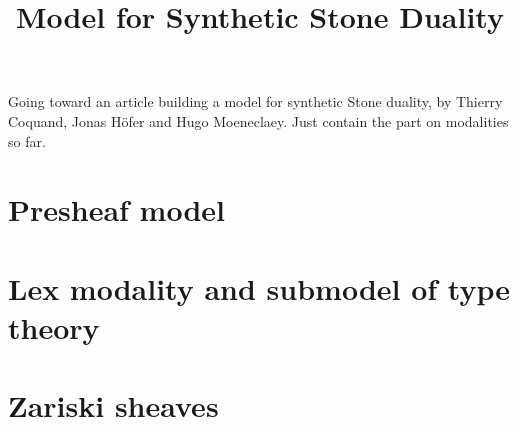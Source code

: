 \documentclass{../util/zariski}
\title{Model for Synthetic Stone Duality}
\begin{document}
\maketitle

Going toward an article building a model for synthetic Stone duality, by Thierry Coquand, Jonas Höfer and Hugo Moeneclaey. Just contain the part on modalities so far.

\tableofcontents

\section{Presheaf model}


\section{Lex modality and submodel of type theory}


\section{Zariski sheaves}


%

%

%

%



\printindex

\printbibliography
\end{document}
